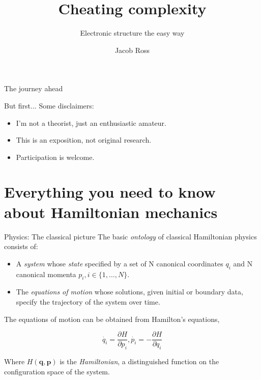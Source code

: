\documentclass[10pt]{beamer}
\title{Cheating complexity}
\subtitle{Electronic structure the easy way}
\date{}
\author{Jacob Ross}
\institute{RSPE invades RSC}
\begin{document}
\maketitle

\begin{frame}{The journey ahead}
  \tableofcontents
\end{frame}

\begin{frame}{But first...} 
Some disclaimers:
\begin{itemize}
    \item I'm not a theorist, just an enthusiastic amateur.
    \item This is an exposition, not original research.
    \item Participation is welcome.
\end{itemize}%
    
\end{frame}


\section{Everything you need to know about Hamiltonian mechanics}
\begin{frame}{Physics: The classical picture}
The basic \emph{ontology} of classical Hamiltonian physics consists of:
    \begin{itemize}
        \item A \emph{system} whose \emph{state} specified by a set of N canonical coordinates $q_i$ and N canonical momenta $p_i, i\in\{1,\dots,N\}$. %
        \item The \emph{equations of motion} whose solutions, given initial or boundary data, specify the trajectory of the system over time. 
    \end{itemize}    
The equations of motion can be obtained from Hamilton's equations, 

$$ \dot{q_i} = \frac{\partial H}{\partial p_i}, \dot{p_i} = -\frac{\partial H}{\partial q_i} $$

Where $H(\textbf{q},\textbf{p})$ is the \emph{Hamiltonian}, a distinguished function on the configuration space of the system.  %
\end{frame}
\end{document}

